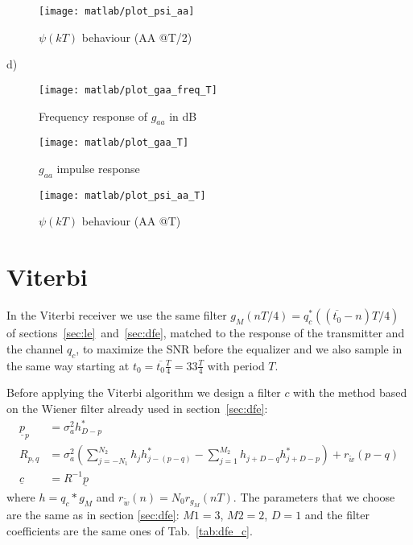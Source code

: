 \documentclass[a4paper,oneside]{article}
\renewcommand{\vec}[1]{\underline{#1}}
\begin{document}
\begin{figure}[h]
  \centering
  \texttt{[image: matlab/plot\_psi\_aa]}
  \caption{$\psi(kT)$ behaviour (AA @T/2)}
  \label{plot:Gaa}
\end{figure}



\newpage
d)
\begin{figure}[h]
  \centering
  \texttt{[image: matlab/plot\_gaa\_freq\_T]}
  \caption{Frequency response of $g_{aa}$ in dB}
  \label{plot:Gaa}
\end{figure}

\begin{figure}[h]
  \centering
  \texttt{[image: matlab/plot\_gaa\_T]}
  \caption{$g_{aa}$ impulse response}
  \label{plot:gaa}
\end{figure}

\begin{figure}[h]
  \centering
  \texttt{[image: matlab/plot\_psi\_aa\_T]}
  \caption{$\psi(kT)$ behaviour (AA @T)}
  \label{plot:Gaa}
\end{figure}


\section{Viterbi}
\label{sec:viterbi}
In the Viterbi receiver we use the same filter $g_M(nT/4) = q_c^*((\overline{t_0} - n)T/4)$ of
sections~\ref{sec:le}~and~\ref{sec:dfe}, matched to the response of
the transmitter and the channel $q_c$, to maximize the
  SNR before the equalizer and we also sample in the same way
starting at $t_0 = \overline{t_0}\frac{T}{4} = 33\frac{T}{4}$ with
period $T$.

Before applying the Viterbi algorithm we design a filter $c$ with the
method based on the Wiener filter already used in
section~\ref{sec:dfe}:
\begin{align}
  \vec{p}_p &= \sigma^2_ah^*_{D-p} \\
  R_{p,q} &= \sigma^2_a\left( \sum_{j=-N_1}^{N_2}h_jh^*_{j-(p-q)} - \sum_{j=1}^{M_2}h_{j+D-q}h^*_{j+D-p} \right) + r_{\tilde{w}}(p-q) \\
    \vec{c} &= R^{-1} \vec{p}
\end{align}
where $h = q_c * g_M$ and $r_{\tilde{w}}(n) = N_0 r_{g_M}(nT)$. The
parameters that we choose are the same as in section \ref{sec:dfe}:
$M1 = 3$, $M2 = 2$, $D=1$ and the filter coefficients are the same ones of
Tab.~\ref{tab:dfe_c}.
\end{document}
